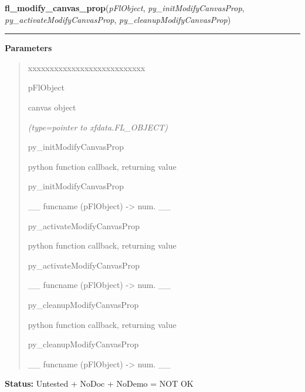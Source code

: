 \hspace{.8\funcindent}\begin{boxedminipage}{\funcwidth}

    \raggedright \textbf{fl\_modify\_canvas\_prop}(\textit{pFlObject}, \textit{py\_initModifyCanvasProp}, \textit{py\_activateModifyCanvasProp}, \textit{py\_cleanupModifyCanvasProp})

    \vspace{-1.5ex}

    \rule{\textwidth}{0.5\fboxrule}
\setlength{\parskip}{2ex}
\setlength{\parskip}{1ex}
      \textbf{Parameters}
      \vspace{-1ex}

      \begin{quote}
        \begin{Ventry}{xxxxxxxxxxxxxxxxxxxxxxxxxxx}

          \item[pFlObject]

          canvas object

            {\it (type=pointer to xfdata.FL\_OBJECT)}

          \item[py\_initModifyCanvasProp]

          python function callback, returning value

          \item[py\_initModifyCanvasProp]

          \_\_ funcname (pFlObject) -{\textgreater} num. \_\_

          \item[py\_activateModifyCanvasProp]

          python function callback, returning value

          \item[py\_activateModifyCanvasProp]

          \_\_ funcname (pFlObject) -{\textgreater} num. \_\_

          \item[py\_cleanupModifyCanvasProp]

          python function callback, returning value

          \item[py\_cleanupModifyCanvasProp]

          \_\_ funcname (pFlObject) -{\textgreater} num. \_\_

        \end{Ventry}

      \end{quote}

\textbf{Status:} Untested + NoDoc + NoDemo = NOT OK



    \end{boxedminipage}

